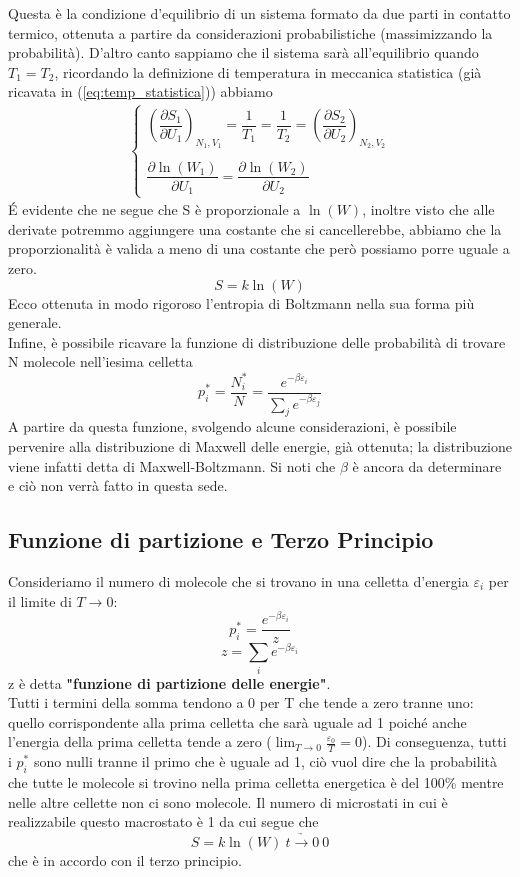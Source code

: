 \documentclass[
10pt, %
a4paper, %
oneside, %
headinclude,footinclude, %
BCOR5mm, %
]{scrartcl}
\begin{document}
Questa è la condizione d'equilibrio di un sistema formato da due parti in contatto termico, ottenuta a partire da considerazioni probabilistiche (massimizzando la probabilità). D'altro canto sappiamo che il sistema sarà all'equilibrio quando \(T_1 = T_2\), ricordando la definizione di temperatura in meccanica statistica (già ricavata in (\ref{eq:temp_statistica})) abbiamo 
\begin{align*}
	\begin{cases}
		\left(\dfrac{\partial S_1}{\partial U_1}\right)_{N_1, V_1} = \dfrac{1}{T_1} = \dfrac{1}{T_2} = \left(\dfrac{\partial S_2}{\partial U_2}\right)_{N_2, V_2}\\\\
		\dfrac{\partial \ln(W_1)}{\partial U_1} = \dfrac{\partial \ln(W_2)}{\partial U_2}
	\end{cases}
\end{align*}
\'{E} evidente che ne segue che S è proporzionale a \(\ln(W)\), inoltre visto che alle derivate potremmo aggiungere una costante che si cancellerebbe, abbiamo che la proporzionalità è valida a meno di una costante che però possiamo porre uguale a zero.
\[S = k\ln(W)\] 
Ecco ottenuta in modo rigoroso l'entropia di Boltzmann nella sua forma più generale.\\
Infine, è possibile ricavare la funzione di distribuzione delle probabilità di trovare N molecole nell'iesima celletta 
\[p_i^*=\frac{N_i^*}{N}=\frac{e^{-\beta \varepsilon_i}}{\sum_j e^{-\beta \varepsilon_j}}\]
A partire da questa funzione, svolgendo alcune considerazioni, è possibile pervenire alla distribuzione di Maxwell delle energie, già ottenuta; la distribuzione viene infatti detta di Maxwell-Boltzmann. Si noti che \(\beta\) è ancora da determinare e ciò non verrà fatto in questa sede. 
\subsection{Funzione di partizione e Terzo Principio}
Consideriamo il numero di molecole che si trovano in una celletta d'energia $\varepsilon_i$ per il limite di \(T\to 0\):
\[p_i^*= \frac{e^{-\beta \varepsilon_i}}{z}\]
\[z=\sum_ie^{-\beta \varepsilon_i}\]
z è detta \textbf{"funzione di partizione delle energie"}.\\
Tutti i termini della somma tendono a 0 per T che tende a zero tranne uno: quello corrispondente alla prima celletta che sarà uguale ad 1 poiché anche l'energia della prima celletta tende a zero ($\lim_{T\to 0}\frac{\varepsilon_0}{T}=0$). Di conseguenza, tutti i \(p_i^*\) sono nulli tranne il primo che è uguale ad 1, ciò vuol dire che la probabilità che tutte le molecole si trovino nella prima celletta energetica è del 100\% mentre nelle altre cellette non ci sono molecole. Il numero di microstati in cui è realizzabile questo macrostato è 1 da cui segue che 
\[S=k\ln(W)\ \underrightarrow{t\to0}\ 0\]
che è in accordo con il terzo principio. 
\end{document}
